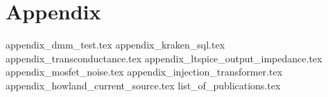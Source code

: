 \documentclass[12pt]{book}
\begin{document}
    \appendix  %
    \chapter{Appendix}
        {appendix_dmm_test.tex}
        \clearpage
        {appendix_kraken_sql.tex}
        \clearpage
        {appendix_transconductance.tex}
        \clearpage
        {appendix_ltspice_output_impedance.tex}
        \clearpage
        {appendix_mosfet_noise.tex}
        \clearpage
        {appendix_injection_transformer.tex}
        \clearpage
        {appendix_howland_current_source.tex}
        \clearpage
        {list_of_publications.tex}
\end{document}
